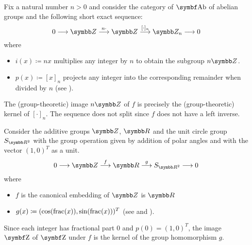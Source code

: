 \begin{Example}\label{ex:short_exact_sequences}
  \mbox{}
  \begin{DefEnum}
     Fix a natural number \( n > 0 \) and consider the category of \( \Cat{Ab} \) of abelian groups and the following short exact sequence:
    \begin{equation*}
      0
      \longrightarrow
      \BZ
      \overset {n \cdot} \longrightarrow
      \BZ
      \overset {\lbrack \cdot \rbrack_n} \longrightarrow
      \BZ_n
      \longrightarrow
      0
    \end{equation*}
    where
    \begin{itemize}
      \item \( i(x) \coloneqq nx \) multiplies any integer by \( n \) to obtain the subgroup \( n \BZ \).
      \item \( p(x) \coloneqq [x]_n \) projects any integer into the corresponding remainder when divided by \( n \) (see ).
    \end{itemize}

    The (group-theoretic) image \( n \BZ \) of \( f \) is precisely the (group-theoretic) kernel of \( [\cdot]_n \). The sequence does not split since \( f \) does not have a left inverse.

     Consider the additive groups \( \BZ \), \( \BR \) and the unit circle group \( S_{\BR^2} \) with the group operation given by addition of polar angles and with the vector \( (1, 0)^T \) as a unit.
    \begin{equation*}
      0
      \longrightarrow
      \BZ
      \overset f \longrightarrow
      \BR
      \overset g \longrightarrow
      S_{\BR^2}
      \longrightarrow
      0
    \end{equation*}
    where
    \begin{itemize}
      \item \( f \) is the canonical embedding of \( \BZ \) is \( \BR \)
      \item \( g(x) \coloneqq (\cos(\operatorname{frac}(x)), \sin(\operatorname{frac}(x)))^T \) (see  and ).
    \end{itemize}

    Since each integer has fractional part \( 0 \) and \( p(0) = (1, 0)^T \), the image \( \Cat{Z} \) of \( \Cat{Z} \) under \( f \) is the kernel of the group homomorphism \( g \).


\end{DefEnum}
\end{Example}

